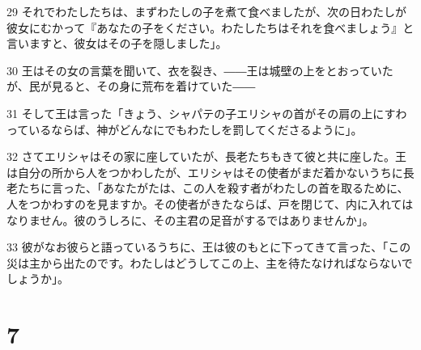 \par 29 それでわたしたちは、まずわたしの子を煮て食べましたが、次の日わたしが彼女にむかって『あなたの子をください。わたしたちはそれを食べましょう』と言いますと、彼女はその子を隠しました」。
\par 30 王はその女の言葉を聞いて、衣を裂き、――王は城壁の上をとおっていたが、民が見ると、その身に荒布を着けていた――
\par 31 そして王は言った「きょう、シャパテの子エリシャの首がその肩の上にすわっているならば、神がどんなにでもわたしを罰してくださるように」。
\par 32 さてエリシャはその家に座していたが、長老たちもきて彼と共に座した。王は自分の所から人をつかわしたが、エリシャはその使者がまだ着かないうちに長老たちに言った、「あなたがたは、この人を殺す者がわたしの首を取るために、人をつかわすのを見ますか。その使者がきたならば、戸を閉じて、内に入れてはなりません。彼のうしろに、その主君の足音がするではありませんか」。
\par 33 彼がなお彼らと語っているうちに、王は彼のもとに下ってきて言った、「この災は主から出たのです。わたしはどうしてこの上、主を待たなければならないでしょうか」。

\chapter{7}


